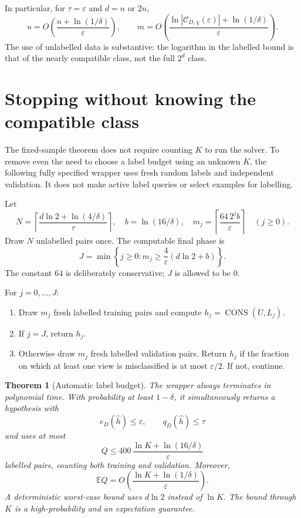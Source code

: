 \documentclass[11pt,a4paper]{article}
\newtheorem{theorem}{Theorem}
\newcommand{\C}{\mathcal C}
\newcommand{\E}{\mathbb E}
\newcommand{\CONS}{\operatorname{CONS}}
\begin{document}
In particular, for \(\tau=\varepsilon\) and \(d=n\) or \(2n\),
\[
 \boxed{\quad
 u=O\!\left(\frac{n+\ln(1/\delta)}{\varepsilon}\right),\qquad
 m=O\!\left(\frac{\ln|\C_{D,\chi}(\varepsilon)|
                         +\ln(1/\delta)}{\varepsilon}\right).
 \quad}
\]
The use of unlabelled data is substantive: the logarithm in the labelled
bound is that of the nearly compatible class, not the full \(2^d\) class.

\section{Stopping without knowing the compatible class}\label{sec:adaptive}

The fixed-sample theorem does not require counting \(K\) to run the solver.
To remove even the need to choose a label budget using an unknown \(K\),
the following fully specified wrapper uses fresh random labels and
independent validation. It does not make active label queries or select
examples for labelling.

Let
\begin{equation}\label{eq:adaptive}
 N=\left\lceil\frac{d\ln2+\ln(4/\delta)}{\tau}\right\rceil,\quad
 b=\ln(16/\delta),\quad
 m_j=\left\lceil\frac{64\,2^j b}{\varepsilon}\right\rceil\quad(j\ge0).
\end{equation}
Draw \(N\) unlabelled pairs once. The computable final phase is
\[
 J=\min\left\{j\ge0:
             m_j\ge\frac4\varepsilon(d\ln2+b)\right\}.
\]
The constant \(64\) is deliberately conservative; \(J\) is allowed to be \(0\).

For \(j=0,\ldots,J\):
\begin{enumerate}
\item Draw \(m_j\) fresh labelled training pairs and compute \(h_j=\CONS(U,L_j)\).
\item If \(j=J\), return \(h_j\).
\item Otherwise draw \(m_j\) fresh labelled validation pairs.
Return \(h_j\) if the fraction on which at least one view is misclassified
is at most \(\varepsilon/2\). If not, continue.
\end{enumerate}

\begin{theorem}[Automatic label budget]\label{thm:adaptive}
The wrapper always terminates in polynomial time. With probability at
least \(1-\delta\), it simultaneously returns a hypothesis with
\[
 e_D(\widehat h)\le\varepsilon,\qquad q_D(\widehat h)\le\tau
\]
and uses at most
\begin{equation}\label{eq:400}
 Q\le400\,\frac{\ln K+\ln(16/\delta)}{\varepsilon}
\end{equation}
labelled pairs, counting both training and validation.
Moreover,
\[
 \E Q=O\!\left(\frac{\ln K+\ln(1/\delta)}{\varepsilon}\right).
\]
A deterministic worst-case bound uses \(d\ln2\) instead of \(\ln K\).
The bound through \(K\) is a high-probability and an expectation guarantee.
\end{theorem}
\end{document}
